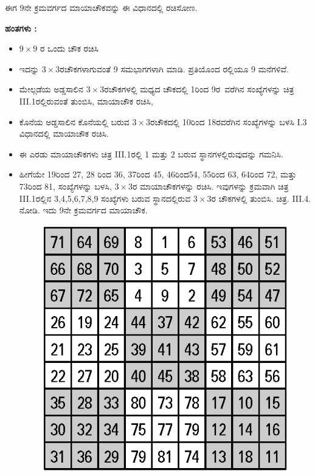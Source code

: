 ಈಗ 9ನೇ ಕ್ರಮವರ್ಗದ ಮಾಯಾಚೌಕವನ್ನು ಈ ವಿಧಾನದಲ್ಲಿ ರಚಿಸೋಣ.

\noindent \textbf{ಹಂತಗಳು :}
\begin{itemize}
	\item $9 \times 9$ ರ ಒಂದು ಚೌಕ ರಚಿಸಿ
	\item ಇದನ್ನು $3 \times 3$ರಚೌಕಗಳಾಗುವಂತೆ 9 ಸಮಭಾಗಗಳಾಗಿ ಮಾಡಿ. ಪ್ರತಿಯೊಂದ ರಲ್ಲಿಯೂ 9 ಮನೆಗಳಿವೆ.
	\item ಮೇಲ್ಗಡೆಯ ಅಡ್ಡಸಾಲಿನ $3 \times 3$ರಚೌಕಗಳಲ್ಲಿ ಮಧ್ಯದ ಚೌಕದಲ್ಲಿ 1ರಿಂದ \hbox{9ರ ವರೆಗಿನ} ಸಂಖ್ಯೆಗಳನ್ನು ಚಿತ್ರ III.1ರಲ್ಲಿರುವಂತೆ ತುಂಬಿಸಿ, ಮಾಯಾಚೌಕ ರಚಿಸಿ,
	\item ಕೊನೆಯ ಅಡ್ಡಸಾಲಿನ ಕೊನೆಯಲ್ಲಿ ಬರುವ $3 \times 3$ರಚೌಕದಲ್ಲಿ 10ರಿಂದ 18ರವರೆಗಿನ ಸಂಖ್ಯೆಗಳನ್ನು ಬಳಸಿ I.3 ವಿಧಾನದಲ್ಲಿ ಮಾಯಾಚೌಕ ರಚಿಸಿ.
	\item ಈ ಎರಡು ಮಾಯಾಚೌಕಗಳು ಚಿತ್ರ III.1ರಲ್ಲಿ 1 ಮತ್ತು 2 ಬರುವ ಸ್ಥಾನಗಳ\-ಲ್ಲಿರುವುದನ್ನು ಗಮನಿಸಿ.
	\item ಹೀಗೆಯೇ 19ರಿಂದ 27, 28 ರಿಂದ 36, 37ರಿಂದ 45, 46ರಿಂದ54, 55ರಿಂದ 63, 64ರಿಂದ 72, ಮತ್ತು 73ರಿಂದ 81, ಸಂಖ್ಯೆಗಳನ್ನು ಬಳಸಿ, $3 \times 3$ರ ಮಾಯಾಚೌಕ\-ಗಳನ್ನು 
	ರಚಿಸಿ. ಇವುಗಳನ್ನು ಕ್ರಮವಾಗಿ ಚಿತ್ರ III.1ರಲ್ಲಿನ 3,4,5,6,7,8,9 ಸಂಖ್ಯೆಗಳು ಬರುವ ಸ್ಥಾನದಲ್ಲಿರುವ $3 \times 3$ರ ಚೌಕಗಳಲ್ಲಿ ತುಂಬಿಸಿ. ಚಿತ್ರ. III.4. ನೋಡಿ. ಇದು 9ನೇ ಕ್ರಮವರ್ಗದ ಮಾಯಾಚೌಕ.
	\begin{figure}[H]
	\includegraphics[scale=.9]{src/figures/chap3/fig3-31.eps}
	\end{figure}
\end{itemize}
